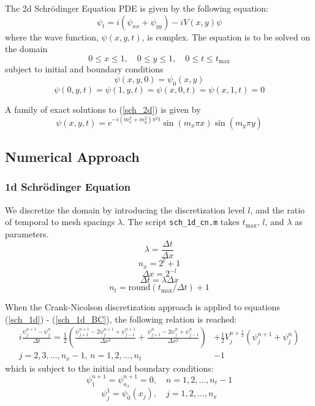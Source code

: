 \documentclass[10pt]{article}
\def\code#1{\texttt{#1}} %
\begin{document}
The 2d Schrödinger Equation PDE is given by the following equation:
\begin{equation}\label{sch_2d}
\psi_t = i(\psi_{xx} + \psi_{yy}) - iV(x,y)\psi
\end{equation}
where the wave function, $\psi(x,y,t)$, is complex. The equation is to be solved on the domain
$$0\leq x \leq 1, \quad 0 \leq y \leq 1, \quad 0\leq t \leq t_{\textrm{max}}$$
subject to initial and boundary conditions
\begin{equation}\label{sch_2d_IC}
\psi(x,y,0) = \psi_0(x,y)
\end{equation}
\begin{equation}\label{sch_2_BC}
\psi(0,y,t) = \psi(1,y,t) = \psi(x,0,t) = \psi(x,1,t) = 0
\end{equation}

A family of exact solutions to (\ref{sch_2d}) is given by
\begin{equation}\label{2d_exact_soln}
\psi(x,y,t) = e^{-i (m_x^2 + m_y^2) \pi^2 t} \sin(m_x \pi x) \sin(m_y \pi y)
\end{equation}

\subsection*{Numerical Approach}

\subsubsection*{1d Schrödinger Equation}

We discretize the domain by introducing the discretization level $l$, and the ratio of temporal to 
mesh spacings $\lambda$. The script \code{sch\_1d\_cn.m} takes $t_{\textrm{max}}$, $l$, and $\lambda$ 
as parameters.
$$\lambda = \frac{\Delta t}{\Delta x}$$
$$n_x = 2^l + 1$$
$$\Delta x = 2^{-l}$$
$$\Delta t = \lambda \Delta x$$
$$n_t = \textrm{round} (t_{\textrm{max}} / \Delta t) + 1$$

When the Crank-Nicolson discretization approach is applied to equations (\ref{sch_1d}) - 
(\ref{sch_1d_BC}), the following relation is reached:  
\begin{align}\label{CN}
i \frac{\psi_j^{n+1} - \psi_j^n}{\Delta t} = \frac{1}{2} \left( 
\frac{\psi_{j+1}^{n+1} - 2\psi_j^{n+1} + \psi_{j-1}^{n+1}}{\Delta x^2} 
+ \frac{\psi_{j+1}^n - 2\psi_j^n + \psi_{j-1}^n}{\Delta x^2} \right)
&+ \frac{1}{2} V_j^{n+\frac{1}{2}} \left(\psi_j^{n+1} + \psi_j^n \right) \nonumber \\
j = 2, 3, \dots, n_x - 1, \, n = 1, 2, \dots, n_t &- 1
\end{align}
which is subject to the initial and boundary conditions:
$$\psi_1^{n+1} = \psi_{n_x}^{n+1} = 0, \quad n = 1, 2, \dots, n_t - 1$$
$$\psi_j^1 = \psi_0(x_j), \quad j = 1, 2, \dots, n_x$$
\end{document}
